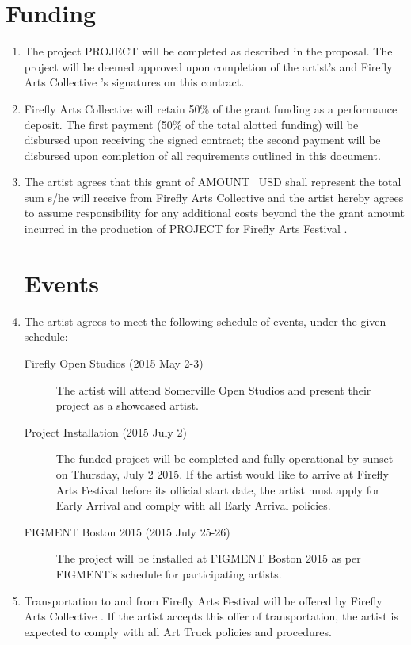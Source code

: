 \documentclass[11pt]{article}
\newcommand{\project}{PROJECT }
\newcommand{\amount}{AMOUNT }
\newcommand{\fac}{Firefly Arts Collective }
\begin{document}
\section*{Funding}
\begin{enumerate}
\item The project \project{} will be completed as described in the proposal.  The project will be deemed approved upon
  completion of the artist's and \fac{}'s signatures on this contract.

\item \fac{} will retain 50\% of the grant funding as a performance deposit.  The first payment (50\% of the total alotted
  funding) will be disbursed upon receiving the signed contract; the second payment will be disbursed upon completion of
  all requirements outlined in this document.

\item The artist agrees that this grant of \amount{}\ USD shall represent the total sum s/he will receive from \fac{} and the artist hereby
  agrees to assume responsibility for any additional costs beyond the the grant amount incurred in the production of
  \project{} for Firefly Arts Festival \the\year.

\section*{Events}
\item The artist agrees to meet the following schedule of events, under the given schedule:

  \begin{description}
    \item[Firefly Open Studios (2015 May 2-3)] The artist will attend Somerville Open Studios and present their project
      as a showcased artist.
    \item[Project Installation (2015 July 2)] The funded project will be completed and fully operational by sunset on
      Thursday, July 2 2015.  If the artist would like to arrive at Firefly Arts Festival before its official start
      date, the artist must apply for Early Arrival and comply with all Early Arrival policies.
    \item[FIGMENT Boston 2015 (2015 July 25-26)] The project will be installed at FIGMENT Boston 2015 as per FIGMENT's schedule for
      participating artists.
  \end{description}

\item Transportation to and from Firefly Arts Festival will be offered by \fac{}.  If the artist accepts this offer of
  transportation, the artist is expected to comply with all Art Truck policies and procedures.
  

\end{enumerate}
\end{document}
